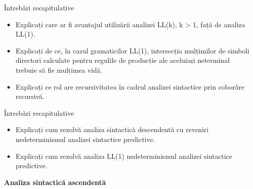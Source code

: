 \documentclass[pdf]{beamer}
\begin{document}
\begin{frame}{Întrebări recapitulative}
\begin{itemize}
\item
Explicați care ar fi avantajul utilizării analizei LL(k), k > 1, față de analiza LL(1).
\newline

\item
Explicați de ce, în cazul gramaticilor LL(1), intersecția mulțimilor de simboli directori calculate pentru regulile de producție ale aceluiași neterminal trebuie să fie mulțimea vidă.
\newline

\item
Explicați ce rol are recursivitatea în cadrul analizei sintactice prin coborâre recursivă.

\end{itemize}
\end{frame}



\begin{frame}{Întrebări recapitulative}
\begin{itemize}
\item
Explicați cum rezolvă analiza sintactică descendentă cu reveniri nedeterminismul analizei sintactice predictive.
\newline

\item
Explicați cum rezolvă analiza LL(1) nedeterminismul analizei sintactice predictive.
\newline

\end{itemize}
\end{frame}






\begin{frame}
\begin{center}
\textbf{Analiza sintactică ascendentă}
\end{center}
\end{frame}
\end{document}
